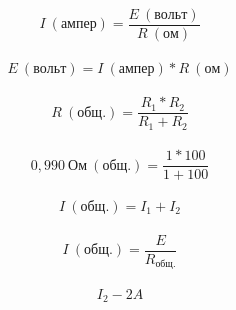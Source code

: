 \documentclass[a4paper]{article}
\begin{document}
	\[
	I \ (ампер) = \frac{E \ (вольт)}{R \ (ом)}
	\]
	\\
	\[
	E \ (вольт) = I \ (ампер) * R \ (ом)
	\]
	\\
	\[
	R \ (общ.) = \frac{R_{1} * R_{2}}{R_{1} + R_{2}}
	\]
	\\
	\[
	0,990 \ Ом \ (общ.) = \frac{1 * 100}{1 + 100}
	\]
	\\
	\[
	I \ (общ.) = I_{1} + I_{2}
	\]
	\\
	\[
	I \ (общ.) = \frac{E}{R_{общ.}}
	\]
	\\
	\[
	I_{2} - 2A
	\]
	
	
\end{document}
